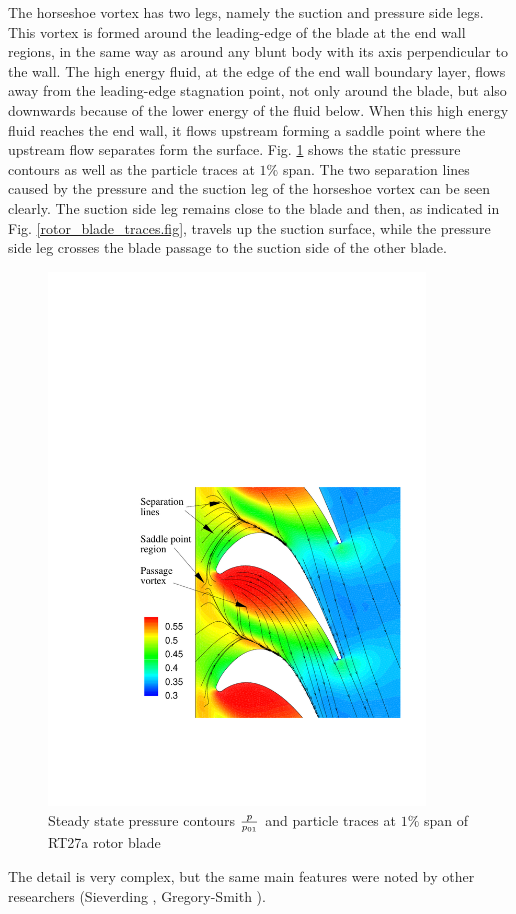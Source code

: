  The horseshoe vortex has two legs, namely the suction and pressure side legs.
 This vortex is formed around the leading-edge of the blade at the end wall
 regions, in the same way as around any blunt body with its axis
 perpendicular to the wall. The high energy fluid, at the edge
 of the end wall boundary layer, flows away from the leading-edge
 stagnation point, not only around the blade, but also downwards because of
 the lower energy of the fluid below.
 When this high energy fluid reaches the end wall, it flows upstream forming
 a saddle point where the upstream flow separates form the surface.
 Fig. \ref{rotor_hub_traces.fig} shows the static pressure contours as well
 as the particle traces at $1\%$ span. The two separation lines
 caused by the pressure and the suction leg of the horseshoe vortex can
 be seen clearly.
 The suction side leg remains close to the blade and then, as indicated in
 Fig. \ref{rotor_blade_traces.fig}, travels up the suction surface,
 while the pressure side leg crosses the blade passage to the suction
 side of the other blade.
%
\begin{figure}
 \centerline{\includegraphics[width=100mm]{CHAP_RT27/FIGURE/rotor_hub_traces.pdf}}
 \caption{Steady state pressure contours $\frac{p}{p_{\mbox{\tiny $01$}}}$
          and particle traces at $1\%$ span of RT27a rotor blade}
 \label{rotor_hub_traces.fig}
\end{figure}
%
 The detail is very complex, but the same main features were noted
 by other researchers (Sieverding ,
 Gregory-Smith ).

